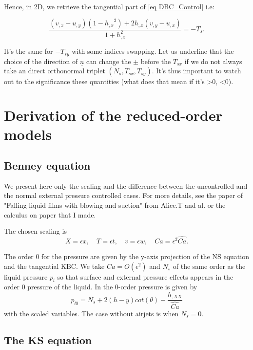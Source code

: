 \documentclass[12pt]{article}
\begin{document}
Hence, in 2D, we retrieve the tangential part of \eqref{eq DBC_Control} i.e: 

$$    \frac{(v_{,x} + u_{,y})(1-{h_{,x}}^2)+2h_{,x}(v_{,y}-u_{,x})}{1+h_{,x}^2}= -T_s. $$

It's the same for $-T_{sy}$ with some indices swapping. Let us underline that the choice of the direction of $\underline{n}$ can change the $\pm$ before the $T_{sx}$ if we do not always take an direct orthonormal triplet $(N_s, T_{sx}, T_{sy})$. It's thus important to watch out to the significance these quantities (what does that mean if it's >0, <0). 

\section{Derivation of the reduced-order models}
\subsection{Benney equation}
We present here only the scaling and the difference between the uncontrolled and the normal external pressure controlled cases. For more details, see the paper of "Falling liquid films with blowing and suction" from Alice.T and al. or the calculus on paper that I made. 

The chosen scaling is $$X=\epsilon x, \quad T=\epsilon t, \quad v=\epsilon w, \quad Ca=\epsilon^2 \hat{Ca}.$$

The order 0 for the pressure are given by the y-axis projection of the NS equation and the tangential KBC. We take $Ca=O(\epsilon^2)$ and $N_s$ of the same order as the liquid pressure $p_l$ so that surface and external pressure effects appears in the order 0 pressure of the liquid. In the 0-order pressure is given by $$p_{l0} = N_s+2(h-y)cot(\theta)-\frac{h_{,XX}}{\hat{Ca}}$$ with the scaled variables. The case without airjets is when $N_s=0$.

\subsection{The KS equation}

\printbibliography
\end{document}
